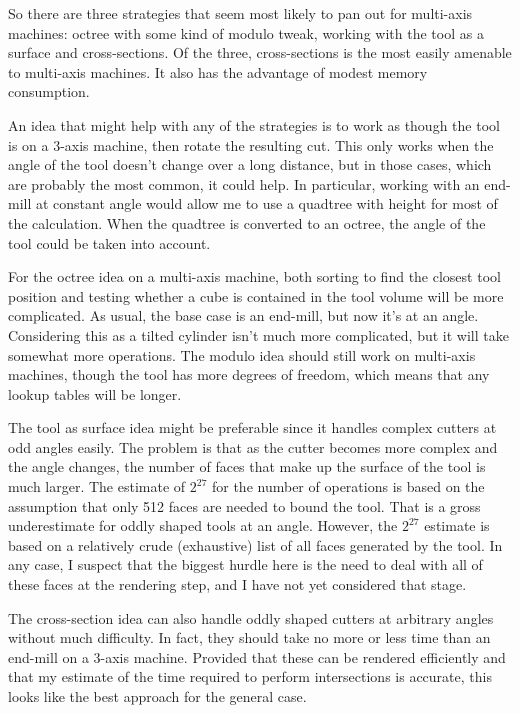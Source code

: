 \documentclass[titlepage,oneside,10pt]{article}
\begin{document}
So there are three strategies that seem most likely to pan out for multi-axis
machines: octree with some kind of modulo tweak, working with the tool
as a surface and cross-sections. Of the three, cross-sections is the
most easily amenable to multi-axis machines. It also has the advantage
of modest memory consumption.

An idea that might help with any of the strategies is to work as
though the tool is on a 3-axis machine, then rotate the resulting
cut. This only works when the angle of the tool doesn't change over a
long distance, but in those cases, which are probably the most common,
it could help. In particular, working with an end-mill at constant
angle would allow me to use a quadtree with height for most of the
calculation. When the quadtree is converted to an octree, the angle of
the tool could be taken into account.

For the octree idea on a multi-axis machine, both sorting to find the
closest tool position and testing whether a cube is contained in the
tool volume will be more complicated. As usual, the base case is an
end-mill, but now it's at an angle. Considering this as a tilted
cylinder isn't much more complicated, but it will take somewhat more
operations. The modulo idea should still work on multi-axis machines,
though the tool has more degrees of freedom, which means that any
lookup tables will be longer.

The tool as surface idea might be preferable since it handles complex
cutters at odd angles easily. The problem is that as the cutter
becomes more complex and the angle changes, the number of faces that
make up the surface of the tool is much larger. The estimate of
$2^{27}$ for the number of operations is based on the assumption that
only 512 faces are needed to bound the tool. That is a gross
underestimate for oddly shaped tools at an angle. However, the
$2^{27}$ estimate is based on a relatively crude (exhaustive) list of
all faces generated by the tool. In any case, I suspect that the
biggest hurdle here is the need to deal with all of these faces at the
rendering step, and I have not yet considered that stage.

The cross-section idea can also handle oddly shaped cutters at
arbitrary angles without much difficulty. In fact, they should take no
more or less time than an end-mill on a 3-axis machine. Provided that
these can be rendered efficiently and that my estimate of the time
required to perform intersections is accurate, this looks like the
best approach for the general case.
\end{document}
